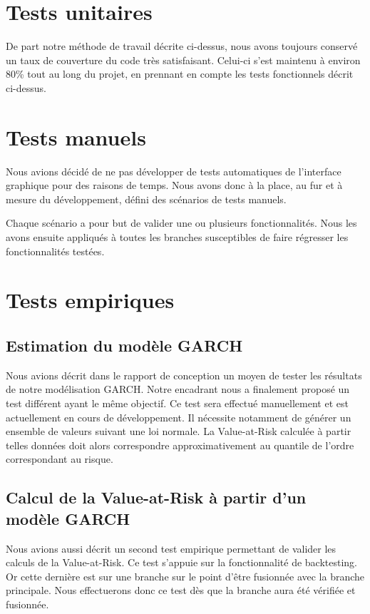 \documentclass[a4paper,titlepage,french]{report}
\begin{document}
\section{Tests unitaires}

De part notre méthode de travail décrite ci-dessus, nous avons toujours conservé un taux de couverture du code très satisfaisant.
Celui-ci s'est maintenu à environ 80\% tout au long du projet, en prennant en compte les tests fonctionnels décrit ci-dessus.


\section{Tests manuels}

Nous avions décidé de ne pas développer de tests automatiques de l'interface graphique pour des raisons de temps.
Nous avons donc à la place, au fur et à mesure du développement, défini des scénarios de tests manuels.

Chaque scénario a pour but de valider une ou plusieurs fonctionnalités.
Nous les avons ensuite appliqués à toutes les branches susceptibles de faire régresser les fonctionnalités testées.


\section{Tests empiriques}

\subsection{Estimation du modèle GARCH}

Nous avions décrit dans le rapport de conception un moyen de tester les résultats de notre modélisation GARCH. Notre encadrant nous a finalement proposé un test différent ayant le même objectif.
Ce test sera effectué manuellement et est actuellement en cours de développement.
Il nécessite notamment de générer un ensemble de valeurs suivant une loi normale. La Value-at-Risk calculée à partir telles données doit alors correspondre approximativement au quantile de l'ordre correspondant au risque.

\subsection{Calcul de la Value-at-Risk à partir d'un modèle GARCH}

Nous avions aussi décrit un second test empirique permettant de valider les calculs de la Value-at-Risk.
Ce test s'appuie sur la fonctionnalité de backtesting.
Or cette dernière est sur une branche sur le point d'être fusionnée avec la branche principale.
Nous effectuerons donc ce test dès que la branche aura été vérifiée et fusionnée.
\end{document}
